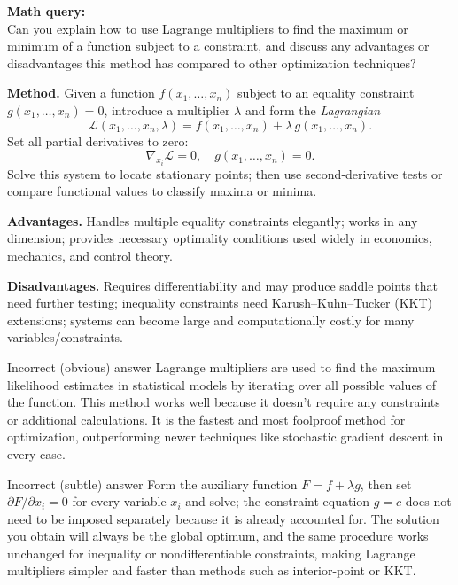 \textbf{Math query:}\\
Can you explain how to use Lagrange multipliers to find the maximum or minimum of a function subject to a constraint, and discuss any advantages or disadvantages this method has compared to other optimization techniques?

\begin{correctanswer}
\textbf{Method.}  
Given a function \(f(x_1,\dots,x_n)\) subject to an equality constraint \(g(x_1,\dots,x_n)=0\), introduce a multiplier \(\lambda\) and form the \emph{Lagrangian}
\[
\mathcal L(x_1,\dots,x_n,\lambda)=f(x_1,\dots,x_n)+\lambda\,g(x_1,\dots,x_n).
\]
Set all partial derivatives to zero:
\[
\nabla_{x_i}\mathcal L=0,\quad g(x_1,\dots,x_n)=0.
\]
Solve this system to locate stationary points; then use second-derivative tests or compare functional values to classify maxima or minima.  

\textbf{Advantages.}  
Handles multiple equality constraints elegantly; works in any dimension; provides necessary optimality conditions used widely in economics, mechanics, and control theory.  

\textbf{Disadvantages.}  
Requires differentiability and may produce saddle points that need further testing; inequality constraints need Karush–Kuhn–Tucker (KKT) extensions; systems can become large and computationally costly for many variables/constraints.
\end{correctanswer}

\begin{incorrectanswer}{Incorrect (obvious) answer}
Lagrange multipliers are used to find the maximum likelihood estimates in statistical models by iterating over all possible values of the function. This method works well because it doesn't require any constraints or additional calculations. It is the fastest and most foolproof method for optimization, outperforming newer techniques like stochastic gradient descent in every case.
\end{incorrectanswer}

\begin{incorrectanswer}{Incorrect (subtle) answer}
Form the auxiliary function \(F = f + \lambda g\), then set \(\partial F / \partial x_i = 0\) for every variable \(x_i\) and solve; the constraint equation \(g = c\) does not need to be imposed separately because it is already accounted for. The solution you obtain will always be the global optimum, and the same procedure works unchanged for inequality or nondifferentiable constraints, making Lagrange multipliers simpler and faster than methods such as interior-point or KKT.
\end{incorrectanswer}


